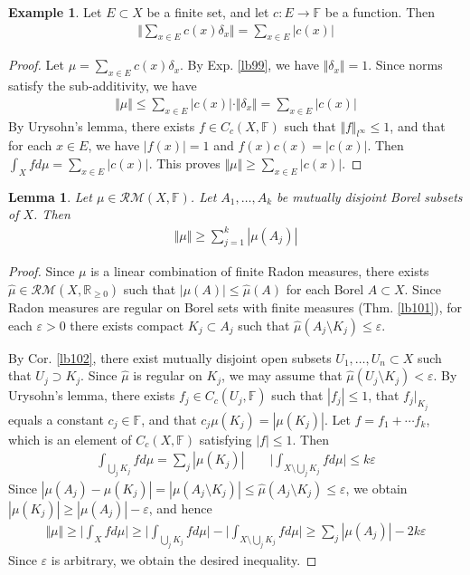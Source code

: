 \documentclass[12pt,b5paper,notitlepage]{article}
\theoremstyle{definition}
\newtheorem{eg}[df]{Example}
\theoremstyle{plain}
\newtheorem{lm}[df]{Lemma}
\newcommand{\wht}{\widehat}
\newcommand{\Rbb}{\mathbb R}
\newcommand{\Fbb}{\mathbb F}
\newcommand{\eps}{\varepsilon}
\newcommand{\RM}{\mathcal {RM}}
\numberwithin{equation}{section}
\begin{document}
\begin{eg}\label{lb103}
Let $E\subset X$ be a finite set, and let $c:E\rightarrow\Fbb$ be a function. Then
\begin{align}
\Big\Vert  \sum_{x\in E}c(x)\delta_x\Big\Vert=\sum_{x\in E}|c(x)|
\end{align}
\end{eg}

\begin{proof}
Let $\mu=\sum_{x\in E}c(x)\delta_x$. By Exp. \ref{lb99}, we have $\Vert\delta_x\Vert=1$. Since norms satisfy the sub-additivity, we have
\begin{align*}
\Vert\mu\Vert\leq\sum_{x\in E}|c(x)|\cdot\Vert\delta_x\Vert=\sum_{x\in E}|c(x)|
\end{align*}
By Urysohn's lemma, there exists $f\in C_c(X,\Fbb)$ such that $\Vert f\Vert_{l^\infty}\leq 1$, and that for each $x\in E$, we have $|f(x)|=1$ and $f(x)c(x)=|c(x)|$. Then $\int_X fd\mu=\sum_{x\in E}|c(x)|$. This proves $\Vert\mu\Vert\geq\sum_{x\in E}|c(x)|$.
\end{proof}


\begin{lm}\label{lb104}
Let $\mu\in\RM(X,\Fbb)$. Let $A_1,\dots,A_k$ be mutually disjoint Borel subsets of $X$. Then
\begin{align*}
\Vert\mu\Vert\geq\sum_{j=1}^k |\mu(A_j)|
\end{align*}
\end{lm}

\begin{proof}
Since $\mu$ is a linear combination of finite Radon measures, there exists $\wht\mu\in\RM(X,\Rbb_{\geq0})$ such that $|\mu(A)|\leq \wht\mu(A)$ for each Borel $A\subset X$. Since Radon measures are regular on Borel sets with finite measures (Thm. \ref{lb101}), for each $\eps>0$ there exists compact $K_j\subset A_j$ such that $\wht\mu(A_j\setminus K_j)\leq \eps$. 

By Cor. \ref{lb102}, there exist mutually disjoint open subsets $U_1,\dots,U_n\subset X$ such that $U_j\supset K_j$. Since $\wht\mu$ is regular on $K_j$, we may assume that $\wht\mu(U_j\setminus K_j)<\eps$. By Urysohn's lemma, there exists $f_j\in C_c(U_j,\Fbb)$ such that $|f_j|\leq 1$, that $f_j|_{K_j}$ equals a constant $c_j\in\Fbb$, and that $c_j\mu(K_j)=|\mu(K_j)|$. Let $f=f_1+\cdots f_k$, which is an element of $C_c(X,\Fbb)$ satisfying $|f|\leq 1$. Then 
\begin{align*}
\int_{\bigcup_j K_j}fd\mu=\sum_j|\mu(K_j)|\qquad \Big|\int_{X\setminus\bigcup_j K_j} fd\mu\Big|\leq k\eps
\end{align*}
Since $|\mu(A_j)-\mu(K_j)|=|\mu(A_j\setminus K_j)|\leq\wht\mu(A_j\setminus K_j)\leq\eps$, we obtain $|\mu(K_j)|\geq |\mu(A_j)|-\eps$, and hence
\begin{align*}
\Vert\mu\Vert\geq\Big|\int_X fd\mu\Big|\geq\Big|\int_{\bigcup_j K_j}fd\mu\Big|-\Big|\int_{X\setminus\bigcup_j K_j} fd\mu \Big|\geq \sum_j |\mu(A_j)|-2k\eps
\end{align*}
Since $\eps$ is arbitrary, we obtain the desired inequality.
\end{proof}
\end{document}
